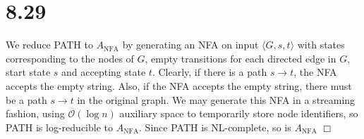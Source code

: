 \documentclass{article}
\begin{document}
\section*{8.29}
We reduce PATH to $A_{\mathrm{NFA}}$ by generating an NFA on input $\langle G,s,t \rangle$ with states corresponding to the nodes of $G$, empty transitions for each directed edge in $G$, start state $s$ and accepting state $t$. Clearly, if there is a path $s \to t$, the NFA accepts the empty string. Also, if the NFA accepts the empty string, there must be a path $s \to t$ in the original graph. We may generate this NFA in a streaming fashion, using $\mathcal{O}(\log n)$ auxiliary space to temporarily store node identifiers, so PATH is log-reducible to $A_{\mathrm{NFA}}$. Since PATH is NL-complete, so is $A_{\mathrm{NFA}}$ $\Box$
\end{document}
